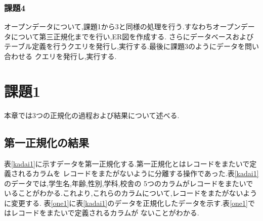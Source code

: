 \documentclass[a4j]{jarticle}
\begin{document}
    \subsubsection{課題4}
    オープンデータについて,課題1から3と同様の処理を行う.すなわちオープンデータについて第三正規化までを行い,ER図を作成する.
    さらにデータベースおよびテーブル定義を行うクエリを発行し,実行する.最後に課題3のようにデータを問い合わせる
    クエリを発行し,実行する.
    \section{課題1}
    本章では3つの正規化の過程および結果について述べる.
    \subsection{第一正規化の結果}
    表\ref{kadai1}に示すデータを第一正規化する.第一正規化とはレコードをまたいで定義されるカラムを
    レコードをまたがないように分離する操作であった.表\ref{kadai1}のデータでは,学生名,年齢,性別,学科,校舎の
    5つのカラムがレコードをまたいでいることがわかる.これより,これらのカラムについて,レコードをまたがないように変更する.
    表\ref{one1}に表\ref{kadai1}のデータを正規化したデータを示す.表\ref{one1}ではレコードをまたいで定義されるカラムが
    ないことがわかる.
\end{document}
